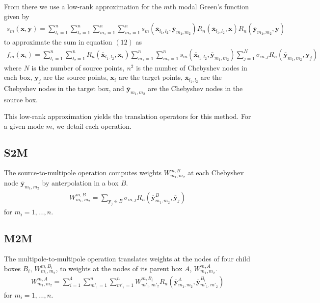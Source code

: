 \documentclass[11pt, oneside]{article}   	%
\begin{document}
From there we use a low-rank approximation for the $m$th modal Green's function given by
\begin{align}
s_m(\mathbf{x},\mathbf{y}) = \sum_{l_1=1}^n\sum_{l_2=1}^n\sum_{m_1=1}^n\sum_{m_2=1}^n s_m(\mathbf{\overline{x}}_{l_1,l_2},\mathbf{\overline{y}}_{m_1,m_2})R_n(\mathbf{\overline{x}}_{l_1,l_2},\mathbf{x})R_n(\mathbf{\overline{y}}_{m_1,m_2},\mathbf{y})
\end{align}
to approximate the sum in equation $(12)$ as
\begin{align}
f_m(\mathbf{x}_i)=\sum_{l_1=1}^n \sum_{l_2=1}^n R_n(\mathbf{\overline{x}}_{l_1,l_2},\mathbf{x}_i) \sum_{m_1=1}^n \sum_{m_2=1}^n s_m(\mathbf{\overline{x}}_{l_1,l_2},\mathbf{\overline{y}}_{m_1,m_2}) \sum_{j=1}^N \sigma_{m,j}R_n(\mathbf{\overline{y}}_{m_1,m_2},\mathbf{y}_j)
\end{align}
where $N$ is the number of source points, $n^2$ is the number of Chebyshev nodes in each box, $\mathbf{y}_j$ are the source points, $\mathbf{x}_i$ are the target points, $\mathbf{\overline{x}}_{l_1,l_2}$ are the Chebyshev nodes in the target box, and $\mathbf{\overline{y}}_{m_1,m_2}$ are the Chebyshev nodes in the source box.

This low-rank approximation yields the translation operators for this method. For a given mode $m$, we detail each operation.
\subsection{S2M}
The source-to-multipole operation computes weights $W^{m,B}_{m_1,m_2}$ at each Chebyshev node $\mathbf{\overline{y}}_{m_1,m_2}$ by anterpolation in a box $B$.
\begin{align}
W_{m_1,m_2}^{m,B} = \sum_{\mathbf{y}_j\in B} \sigma_{m,j} R_n(\mathbf{\overline{y}}^B_{m_1,m_2},\mathbf{\overline{y}}_j)
\end{align}
for $m_i = 1,\dots,n$.
\subsection{M2M}
The multipole-to-multipole operation translates weights at the nodes of four child boxes $B_i$, $W_{m_1,m_2}^{m,B_i}$, to weights at the nodes of its parent box $A$, $W_{m_1,m_2}^{m,A}$.
\begin{align}
W_{m_1,m_2}^{m,A} = \sum_{i=1}^4 \sum_{m'_1=1}^n\sum_{m'_2=1}^n W_{m'_1,m'_2}^{m,B_i} R_n(\mathbf{\overline{y}}^A_{m_1,m_2},\mathbf{\overline{y}}^{B_i}_{m'_1,m'_2})
\end{align}
for $m_i= 1,\dots,n$.
\end{document}
